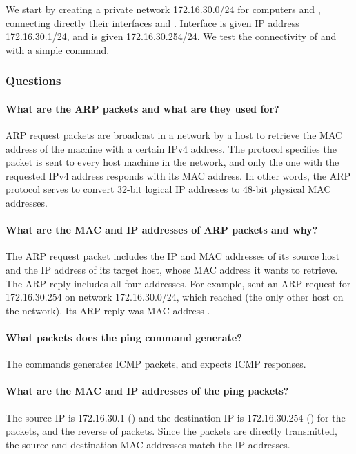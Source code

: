 \documentclass[compilation.tex]{subfiles}
\begin{document}
We start by creating a private network 172.16.30.0/24 for computers  and , connecting directly their interfaces  and . Interface  is given IP address 172.16.30.1/24, and  is given 172.16.30.254/24.
We test the connectivity of  and  with a simple  command.

\subsubsection{Questions}
\label{subsubsec:exp1questions}

\paragraph{What are the ARP packets and what are they used for?}
ARP request packets are broadcast in a network by a host to retrieve the MAC address of the machine with a certain IPv4 address.
The protocol specifies the packet is sent to every host machine in the network,
and only the one with the requested IPv4 address responds with its MAC address.
In other words, the ARP protocol serves to convert 32-bit logical IP addresses to 48-bit physical MAC addresses.

\paragraph{What are the MAC and IP addresses of ARP packets and why?}
The ARP request packet includes the IP and MAC addresses of its source host and the IP address of its target host, whose MAC address it wants to retrieve. The ARP reply includes all four addresses.
For example,  sent an ARP request for 172.16.30.254 on network 172.16.30.0/24, which reached  (the only other host on the network). Its ARP reply was MAC address .

\paragraph{What packets does the ping command generate?}
The  commands generates ICMP  packets, and expects ICMP  responses.

\paragraph{What are the MAC and IP addresses of the ping packets?}
The source IP is 172.16.30.1 () and the destination IP is 172.16.30.254 () for the  packets, and the reverse of  packets.
Since the packets are directly transmitted, the source and destination MAC addresses match the IP addresses.
\end{document}
